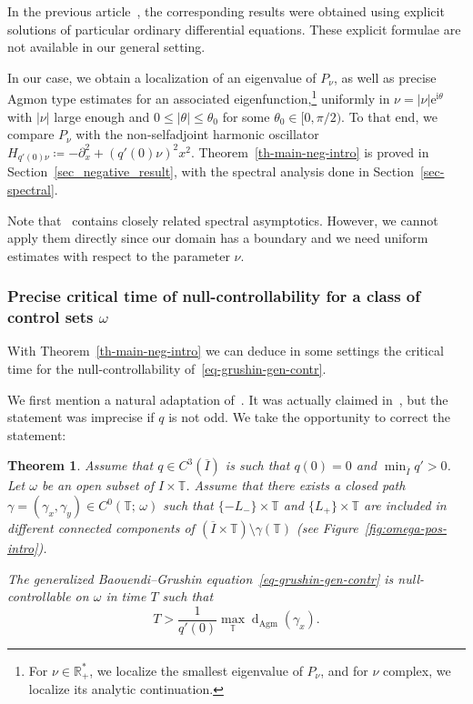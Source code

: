 \documentclass[10pt]{amsart}
\newtheorem{theo}{Theorem}[section]
\theoremstyle{definition}\newtheorem{defi}[theo]{Definition}\newtheorem{rema}[theo]{Remark}\newtheorem{exam}[theo]{Example}\newtheorem{exem}[theo]{Example}\newtheorem{nota}[theo]{Notation}
\renewcommand{\leq}{\leqslant}
\newcommand{\1}{\mathds 1}
\newcommand{\dagmon}{\mathop{\mathrm{d}}\nolimits_{\mathrm{Agm}}}
\newcommand{\R}{\mathbb{R}}
\newcommand{\T}{\mathbb{T}}
\newcommand{\eu}{\mathrm e}
\newcommand{\iu}{\mathrm i}
\newcommand{\g}{\gamma}
\renewcommand{\th}{\theta}
\renewcommand{\o}{\omega}
\begin{document}
In the previous article~\cite{DK20}, the corresponding results were obtained using explicit solutions of particular ordinary differential equations. These explicit formulae are not available in our general setting.

In our case, we obtain a localization of an eigenvalue of $P_\nu$, as well as precise Agmon type estimates for an associated eigenfunction,\footnote{For $\nu \in \R_+^*$, we localize the smallest eigenvalue of $P_\nu$, and for $\nu$ complex, we localize its analytic continuation.} uniformly in $\nu = \vert \nu \vert \eu^{\iu \theta}$ with $\vert \nu \vert$ large enough and $0 \leq \vert \theta \vert \leq \theta_0$ for some $\th_0 \in [0, {\pi}/{2})$. To that end, we compare $P_\nu$ with the non-selfadjoint harmonic oscillator $H_{q'(0)\nu}\coloneqq -\partial_x^2 + (q'(0)\nu)^2 x^2$. Theorem~\ref{th-main-neg-intro} is proved in Section~\ref{sec_negative_result}, with the spectral analysis done in Section~\ref{sec-spectral}.

Note that~\cite{HSS05} contains closely related spectral asymptotics. However, we cannot apply them directly since our domain has a boundary and we need uniform estimates with respect to the parameter $\nu$.

\subsubsection{Precise critical time of null-controllability for a class of control sets $\o$}

With Theorem~\ref{th-main-neg-intro} we can deduce in some settings the critical time for the null-controllability of~\eqref{eq-grushin-gen-contr}.


We first mention a natural adaptation of~\cite[Theorem~3.1]{DK20}. It was actually claimed in~\cite[Remark~3.2]{DK20}, but the statement was imprecise if $q$ is not odd. We take the opportunity to correct the statement:


\begin{theo}\label{th-main-pos-intro}
Assume that $q\in C^3(\overline I)$ is such that $q(0) = 0$ and $\min_{\overline I} q' >0$. Let $\o$ be an open subset of $I\times \T$. Assume that there exists a closed path $\gamma = (\g_x, \g_y) \in C^0(\T;\, \omega)$ such that $\{-L_-\}\times \T$ and $\{L_+\}\times \T$ are included in different connected components of $(\overline I\times\T) \setminus \g(\T)$ (see Figure~\ref{fig:omega-pos-intro}).

The generalized Baouendi--Grushin equation~\eqref{eq-grushin-gen-contr} is null-controllable on $\o$ in time $T$ such that
\[
T> \frac{1}{q'(0)}\max_\T\dagmon(\g_x).
\]
\end{theo}
\end{document}
